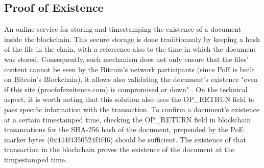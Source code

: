 \documentclass[a4paper]{article}
\begin{document}
\subsection{Proof of Existence \cite{poe}}
An online service for storing and timestamping the existence of a document inside the blockchain. This secure storage is done traditionnaly by keeping a hash of the file in the chain, with a referrence also to the time in which the document was stored. Consequently, such mechanism does not only ensure that the files' content cannot be seen by the Bitcoin's network participants (since PoE is built on Bitcoin's Blockchain), it allows also validating the document's existence "even if this site (proofofexsitence.com) is compromised or down" \cite{poe}. On the technical aspect, it is worth noting that this  solution also uses the OP\_RETRUN field to pass specific information with the transaction. To confirm a document's existence at a certain timestamped time, checking the OP\_RETURN field in blockchain trasancations for the SHA-256 hash of the document, prepended by the PoE marker bytes (0x444f4350524f4f46) should be sufficient. The existence of that transaction in the blockchain proves the existence of the document at the timpestamped time.
\end{document}
